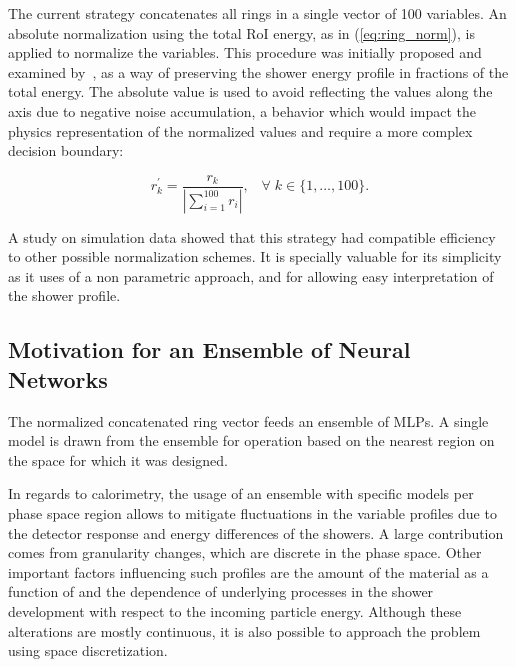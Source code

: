 The current strategy concatenates all rings in a single vector of 100
variables. An absolute normalization using the total RoI energy, as in
(\ref{eq:ring_norm}), is applied to normalize the variables. This procedure was
initially proposed and examined by~\cite{1995_seixas_ringer}, as a way of
preserving the shower energy profile in fractions of the total energy. The
absolute value is used to avoid reflecting the values along the axis due to
negative noise accumulation, a behavior which would impact the physics
representation of the normalized values and require a more complex decision
boundary:

\begin{equation}
  r^\prime_{k} = \frac{r_{k}}{| \sum\limits_{i=1}^{100} r_i
  |}, \;\;\;
    \forall \; k\in\{1,\dots,100\}.
\label{eq:ring_norm}
\end{equation}

A study on simulation data showed that this strategy had compatible
efficiency to other possible normalization schemes. It is specially valuable for its
simplicity as it uses of a non parametric approach, and for allowing easy interpretation of the shower profile. 


\subsection{Motivation for an Ensemble of Neural Networks}\label{top:nn_ensemble}

The normalized concatenated ring vector feeds an ensemble of MLPs. A single
model is drawn from the ensemble for operation based on the nearest region on the \eteta space for which it was designed.

In regards to calorimetry, the usage of an ensemble with specific models per
phase space region allows to mitigate fluctuations in the variable profiles
due to the detector response and energy differences of the showers.
A large contribution comes from granularity changes, which are discrete
in the phase space. Other important factors 
influencing such profiles are the
amount of the material as a function of \abseta{} and the dependence of
underlying processes in the shower development with respect to the incoming
particle energy. Although these alterations are mostly continuous, it is also
possible to approach the problem using space discretization.

